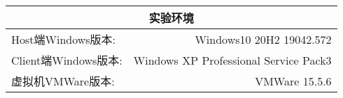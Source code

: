 \begin{center}
    \begin{tabular}{l  r}
    \hline
        \multicolumn{2}{c}{实验环境} \\ \hline
        Host端Windows版本: & Windows10 20H2 19042.572\\ \hline
        Client端Windows版本: &  Windows XP Professional Service Pack3 \\ \hline%
        虚拟机VMWare版本: & VMWare 15.5.6\\ \hline

    \end{tabular}
\end{center}